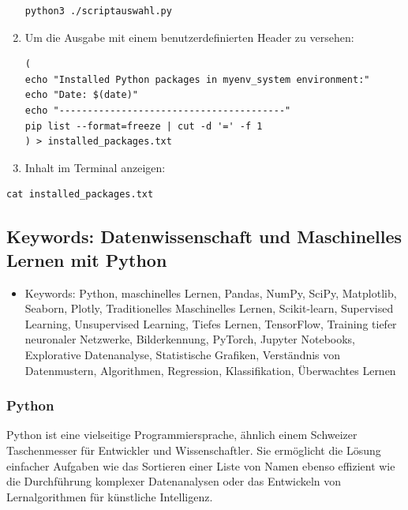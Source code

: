 \documentclass{vorlage-design-main}
\begin{document}
\begin{enumerate}
\begin{lstlisting}
python3 ./scriptauswahl.py
\end{lstlisting}
\item
  Um die Ausgabe mit einem benutzerdefinierten Header zu versehen:

\begin{lstlisting}
(
echo "Installed Python packages in myenv_system environment:"
echo "Date: $(date)"
echo "----------------------------------------"
pip list --format=freeze | cut -d '=' -f 1
) > installed_packages.txt
\end{lstlisting}
\item
  Inhalt im Terminal anzeigen:
\end{enumerate}

\begin{lstlisting}
cat installed_packages.txt
\end{lstlisting}

\subsection{Keywords: Datenwissenschaft und Maschinelles Lernen mit
Python}\label{keywords-datenwissenschaft-und-maschinelles-lernen-mit-python}

\begin{itemize}

\item
  Keywords: Python, maschinelles Lernen, Pandas, NumPy, SciPy,
  Matplotlib, Seaborn, Plotly, Traditionelles Maschinelles Lernen,
  Scikit-learn, Supervised Learning, Unsupervised Learning, Tiefes
  Lernen, TensorFlow, Training tiefer neuronaler Netzwerke,
  Bilderkennung, PyTorch, Jupyter Notebooks, Explorative Datenanalyse,
  Statistische Grafiken, Verständnis von Datenmustern, Algorithmen,
  Regression, Klassifikation, Überwachtes Lernen
\end{itemize}

\subsubsection{Python}\label{python}

Python ist eine vielseitige Programmiersprache, ähnlich einem Schweizer
Taschenmesser für Entwickler und Wissenschaftler. Sie ermöglicht die
Lösung einfacher Aufgaben wie das Sortieren einer Liste von Namen ebenso
effizient wie die Durchführung komplexer Datenanalysen oder das
Entwickeln von Lernalgorithmen für künstliche Intelligenz.
\end{document}
